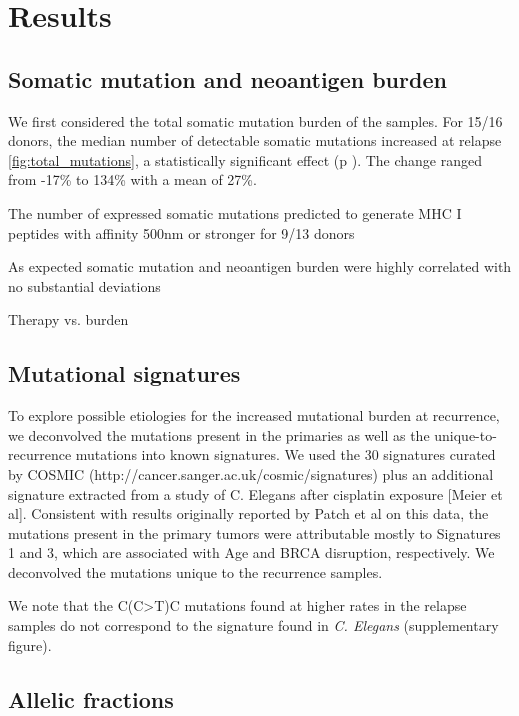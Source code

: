 \section*{Results}
\subsection*{Somatic mutation and neoantigen burden}

We first considered the total somatic mutation burden of the samples. For 15/16 donors, the median number of detectable somatic mutations increased at relapse \ref{fig:total_mutations}, a statistically significant effect (p ). The change ranged from -17\% to 134\% with a mean of 27\%.  

The number of expressed somatic mutations predicted to generate MHC I peptides with affinity 500nm or stronger for   9/13 donors 

As expected somatic mutation and neoantigen burden were highly correlated with no substantial deviations

Therapy vs. burden


\subsection*{Mutational signatures}
To explore possible etiologies for the increased mutational burden at recurrence, we deconvolved the mutations present in the primaries as well as the unique-to-recurrence mutations into known signatures. We used the 30 signatures curated by COSMIC (http://cancer.sanger.ac.uk/cosmic/signatures) plus an additional signature extracted from a study of C. Elegans after cisplatin exposure [Meier et al]. Consistent with results originally reported by Patch et al on this data, the mutations present in the primary tumors were attributable mostly to Signatures 1 and 3, which are associated with Age and BRCA disruption, respectively. We deconvolved the mutations unique to the recurrence samples. 

We note that the C(C>T)C mutations found at higher rates in the relapse samples do not correspond to the signature found in \textit{C. Elegans} (supplementary figure).

\subsection*{Allelic fractions}



